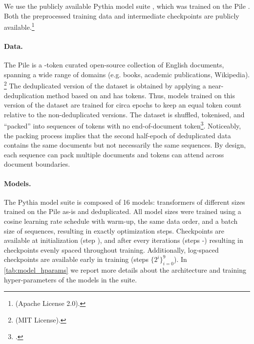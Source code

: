 We use the publicly available Pythia model suite \citep{biderman2023pythia}, which was trained on the Pile \citep{gao2020pile}. Both the preprocessed training data and intermediate checkpoints are publicly available.\footnote{\href{https://github.com/EleutherAI/pythia}{} (Apache License 2.0).} 

\paragraph{Data.}
The Pile is a -token curated open-source collection of English documents, spanning a wide range of domains (e.g. books, academic publications, Wikipedia). \footnote{\href{https://github.com/EleutherAI/the-pile}{} (MIT License).}  
The deduplicated version of the dataset is obtained by applying a near-deduplication method based on  and has  tokens.
Thus, models trained on this version of the dataset are trained for circa  epochs to keep an equal token count relative to the non-deduplicated versions.
The dataset is shuffled, tokenised, and \enquote{packed} into sequences of  tokens with no end-of-document token\footnote{\href{https://github.com/EleutherAI/pythia/issues/123}{}.}.
Noticeably, the packing process implies that the second half-epoch of deduplicated data contains the same documents but not necessarily the same sequences. 
By design, each sequence can pack multiple documents and tokens can attend across document boundaries.

\paragraph{Models.}
The Pythia model suite is composed of 16 models: transformers of  different sizes trained on the Pile as-is and deduplicated.
All model sizes were trained using a cosine learning rate schedule with warm-up, the same data order, and a batch size of  sequences, resulting in exactly  optimization steps.
Checkpoints are available at initialization (step ), and after every  iterations (steps -) resulting in  checkpoints evenly spaced throughout training. 
Additionally, log-spaced checkpoints are available early in training (steps $\{2^i\}_{i=0}^{9}$). In \cref{tab:model_hparams} we report more details about the architecture and training hyper-parameters of the models in the suite.

